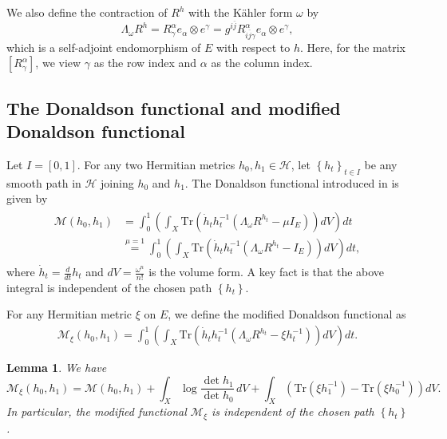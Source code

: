 \documentclass[11pt]{amsart}
\newtheorem{lemma}{Lemma}[section]
\numberwithin{equation}{section}
\theoremstyle{remark}
\renewcommand{\bar}{\overline}
\newcommand{\ka}{K\"ahler }
\newcommand{\M}{{\mathcal M}}
\newcommand{\hh}{{\mathcal H}}
\newcommand{\lb}{\left (}
\newcommand{\rb}{\right )}
\newcommand{\lsb}{\left [}
\newcommand{\rsb}{\right ]}
\newcommand{\lfb}{\left \{}
\newcommand{\rfb}{\right \}}
\newcommand{\ga}{\alpha}
\newcommand{\gm}{\gamma}
\newcommand{\tr}{\text{Tr}}
\begin{document}
We also define the contraction of $R^h$ with the \ka form $\omega$ by
\[
\Lambda_\omega R^h=R_\gm^\ga e_\ga\otimes e^\gm =g^{i\bar j}R_{i\bar j\gm}^\ga e_\ga\otimes e^\gm,
\]
which is a self-adjoint endomorphism of $E$ with respect to $h$. Here, for the matrix $\lsb R_\gm^\ga\rsb$, we view $\gm$ as the row index and $\ga$ as the column index.


\subsection{The Donaldson functional and modified Donaldson functional}
Let $I=[0,1]$. For any two Hermitian metrics $h_0,h_1\in\hh$, let $\lfb h_t\rfb_{t\in I}$ be any smooth path in $\mathcal H$ joining $h_0$ and $h_1$. The Donaldson functional introduced in \cite{sd1} is given by
\begin{align}\label{d20}
\begin{split}
\M\lb h_0,h_1\rb &=\int_0^1 \lb \int_X \tr \lb \dot h_t h_t^{-1}\lb \Lambda_\omega R^{h_t}-\mu I_E\rb\rb dV\rb dt\\
&\overset{\mu=1}{=}\int_0^1 \lb \int_X \tr \lb \dot h_t h_t^{-1}\lb \Lambda_\omega R^{h_t}- I_E\rb\rb dV\rb dt,
\end{split}
\end{align}
where $\dot h_t=\frac{d}{dt}h_t$ and $dV=\frac{\omega^{n}}{n!}$ is the volume form.
A key fact is that the above integral is independent of the chosen path $\lfb h_t\rfb$.

For any Hermitian metric $\xi$ on $E$, we define the modified Donaldson functional as
\begin{eqnarray}\label{d30}
\M_{\xi}\lb h_0,h_1\rb=\int_0^1 \lb \int_X \tr \lb \dot h_t h_t^{-1}\lb \Lambda_\omega R^{h_t}-\xi h_t^{-1}\rb\rb dV\rb dt.
\end{eqnarray}

\begin{lemma}\label{d40}
We have
\[
\M_{\xi}(h_0,h_1)=\M(h_0,h_1)+ \int_X \log\frac{\det h_1}{\det h_0}\, dV+\int_X \lb \tr\lb \xi h_1^{-1}\rb- \tr\lb \xi h_0^{-1}\rb\rb dV.
\]
In particular, the modified functional $\M_{\xi}$ is independent of the chosen path $\lfb h_t\rfb$.
\end{lemma}
\end{document}
